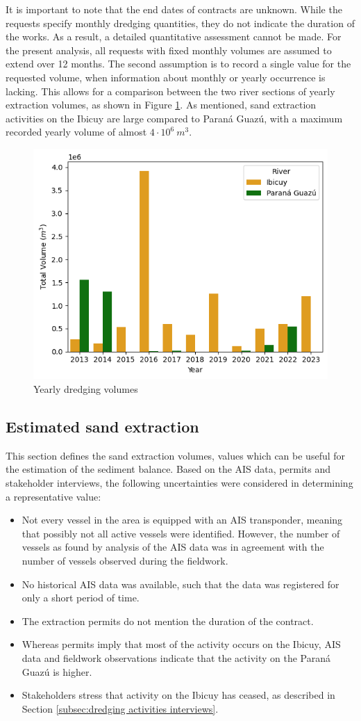 It is important to note that the end dates of contracts are unknown. While the requests specify monthly dredging quantities, they do not indicate the duration of the works. As a result, a detailed quantitative assessment cannot be made. For the present analysis, all requests with fixed monthly volumes are assumed to extend over 12 months. The second assumption is to record a single value for the requested volume, when information about monthly or yearly occurrence is lacking. This allows for a comparison between the two river sections of yearly extraction volumes, as shown in Figure \ref{fig:yearly dredging volumes}. As mentioned, sand extraction activities on the Ibicuy are large compared to Paraná Guazú, with a maximum recorded yearly volume of almost $4 \cdot 10^6 ~m^3$.  

\begin{figure}[H]
    \centering
    \includegraphics[width=0.50\linewidth]{figures/ch2/Dredging volumes permits.png}
    \caption{Yearly dredging volumes}
    \label{fig:yearly dredging volumes}
\end{figure}

\subsection{Estimated sand extraction}
This section defines the sand extraction volumes, values which can be useful for the estimation of the sediment balance. Based on the AIS data, permits and stakeholder interviews, the following uncertainties were considered in determining a representative value:

\begin{itemize}
    \item Not every vessel in the area is equipped with an AIS transponder, meaning that possibly not all active vessels were identified. However, the number of vessels as found by analysis of the AIS data was in agreement with the number of vessels observed during the fieldwork.
    \item No historical AIS data was available, such that the data was registered for only a short period of time.
    \item The extraction permits do not mention the duration of the contract.
    \item Whereas permits imply that most of the activity occurs on the Ibicuy, AIS data and fieldwork observations indicate that the activity on the Paraná Guazú is higher. 
    \item Stakeholders stress that activity on the Ibicuy has ceased, as described in Section \ref{subsec:dredging activities interviews}.
\end{itemize}

